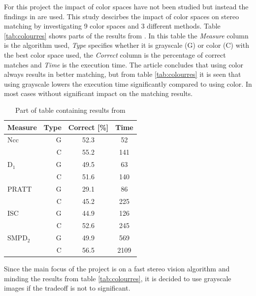 For this project the impact of color spaces have not been studied but instead the findings in \cite{chambon2005colour} are used. This study descirbes the impact of color spaces on stereo matching by investigating 9 color spaces and 3 different methods. Table \vref{tab:colourres} shows parts of the results from \cite{chambon2005colour}. In this table the \textit{Measure} column is the algorithm used, \textit{Type} specifies whether it is grayscale (G) or color (C) with the best color space used, the \textit{Correct} column is the percentage of correct matches and \textit{Time} is the execution time. The article concludes that using color always results in better matching, but from table \vref{tab:colourres} it is seen that using grayscale lowers the execution time significantly compared to using color. In most cases without significant impact on the matching results.\\
\begin{table}
  \centering
  \begin{tabular}{l r | c | c }
    Measure & Type & Correct [\%] & Time\\
    \midrule
    Ncc & G & 52.3 & 52\\
          & C & 55.2 & 141\\
    \midrule
    D$_1$ & G & 49.5 & 63\\
               & C & 51.6 & 140\\
    \midrule
    PRATT & G & 29.1 & 86\\
              & C & 45.2 & 225\\
    \midrule
    ISC & G & 44.9 & 126\\
    & C & 52.6 & 245\\
    \midrule
    SMPD$_2$ & G & 49.9 & 569\\
    & C & 56.5 & 2109 \\
  \end{tabular}
  \caption{Part of table containing results from \cite{chambon2005colour}\label{tab:colourres}}
\end{table}

Since the main focus of the project is on a fast stereo vision algorithm and minding the results from table \vref{tab:colourres}, it is decided to use grayscale images if the tradeoff is not to significant.

